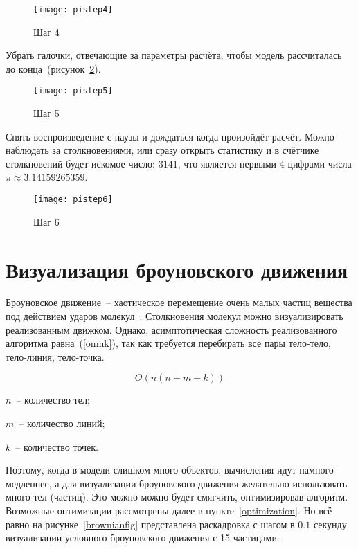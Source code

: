 \begin{figure}[H]
    \centering
    \texttt{[image: pistep4]}
    \caption{Шаг 4\label{pistep4fig}}
\end{figure}

Убрать галочки, отвечающие за параметры расчёта, чтобы модель рассчиталась до конца~(рисунок~\ref{pistep5fig}).

\begin{figure}[H]
    \centering
    \texttt{[image: pistep5]}
    \caption{Шаг 5\label{pistep5fig}}
\end{figure}

Снять воспроизведение с паузы и дождаться когда произойдёт расчёт. Можно наблюдать за столкновениями,
или сразу открыть статистику и в счётчике столкновений будет искомое число: \(3141\), что является
первыми 4 цифрами числа \(\pi \approx 3.14159265359\).

\begin{figure}[H]
    \centering
    \texttt{[image: pistep6]}
    \caption{Шаг 6\label{pistep6fig}}
\end{figure}

\section{Визуализация броуновского движения}

Броуновское движение~-- хаотическое перемещение очень малых частиц вещества под действием ударов молекул~\cite{browniankrugosvet}.
Столкновения молекул можно визуализировать реализованным движком.
Однако, асимптотическая сложность реализованного алгоритма равна~(\ref{onmk}), так как требуется перебирать все пары тело-тело, тело-линия, тело-точка.

\begin{equation}\label{onmk}
    O(n(n + m + k))
\end{equation}

\begin{Underequation}
    \(n\)~-- количество тел;

    \(m\)~-- количество линий;

    \(k\)~-- количество точек.
\end{Underequation}

Поэтому, когда в модели слишком много объектов, вычисления идут намного медленнее, а для визуализации броуновского движения желательно использовать много тел (частиц).
Это можно можно будет смягчить, оптимизировав алгоритм. Возможные оптимизации рассмотрены далее в пункте~\ref{optimization}.
Но всё равно на рисунке~\ref{brownianfig} представлена раскадровка с шагом в \(0.1\) секунду визуализации условного броуновского движения с 15 частицами.

